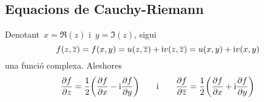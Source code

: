 \documentclass[../Apunts.tex]{subfiles}
\begin{document}
	\subsection{Equacions de Cauchy-Riemann}
	\begin{lemma}
		\label{lema:equacions de Cauchy-Riemann}
		Denotant~\(x=\Re(z)\) i~\(y=\Im(z)\), sigui
		\begin{equation*}
			\label{eq:1:lema:equaciosn de Cauchy-Riemann}
			f(z,\overline{z})=f(x,y)=u(z,\overline{z})+\mathrm{i} v(z,\overline{z})=u(x,y)+\mathrm{i} v(x,y)
		\end{equation*}
		una funció complexa. Aleshores
		\begin{equation*}
			\label{eq:3:lema:equacions de Cauchy-Riemann}
			\frac{\partial f}{\partial z}=\frac{1}{2}\biggl(\frac{\partial f}{\partial x}-\mathrm{i}\frac{\partial f}{\partial y}\biggr)\qquad\text{i}\qquad\frac{\partial f}{\partial\overline{z}}=\frac{1}{2}\biggl(\frac{\partial f}{\partial x}+\mathrm{i}\frac{\partial f}{\partial y}\biggr)
		\end{equation*}
	\end{lemma}
\end{document}
